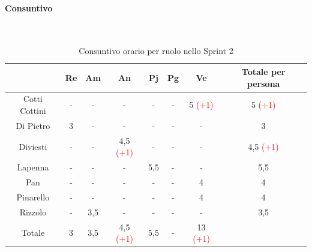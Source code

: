 \documentclass{article}
\begin{document}
                \paragraph{Consuntivo}\mbox{}\\
                \begin{table}[H]
                    \centering
                    \begin{tabular}{|c|c|c|c|c|c|c|c|}
                        \hline
                                      & Re  & Am  & An  & Pj  & Pg  & Ve  & Totale per persona \\ \hline
                        Cotti Cottini & -   & -   & -   & -   & -   & 5 \textcolor{red}{(+1)}   & 5 \textcolor{red}{(+1)}                  \\ \hline
                        Di Pietro     & 3   & -   & -   & -   & -   & -   & 3                  \\ \hline
                        Diviesti      & -   & -   & 4,5 \textcolor{red}{(+1)} & -   & -   & -   & 4,5 \textcolor{red}{(+1)}               \\ \hline
                        Lapenna       & -   & -   & -   & 5,5 & -   & -   & 5,5                \\ \hline
                        Pan           & -   & -   & -   & -   & -   & 4   & 4                  \\ \hline
                        Pinarello     & -   & -   & -   & -   & -  & 4   & 4                 \\ \hline
                        Rizzolo       & -   & 3,5 & -   & -   & -   & -   & 3,5                \\ \hline
                        Totale        & 3   & 3,5 & 4,5 \textcolor{red}{(+1)} & 5,5 & -  & 13 \textcolor{red}{(+1)}  &                    \\ \hline
                        \end{tabular}
                    \caption{Consuntivo orario per ruolo nello Sprint 2}
                \end{table}

\end{document}
